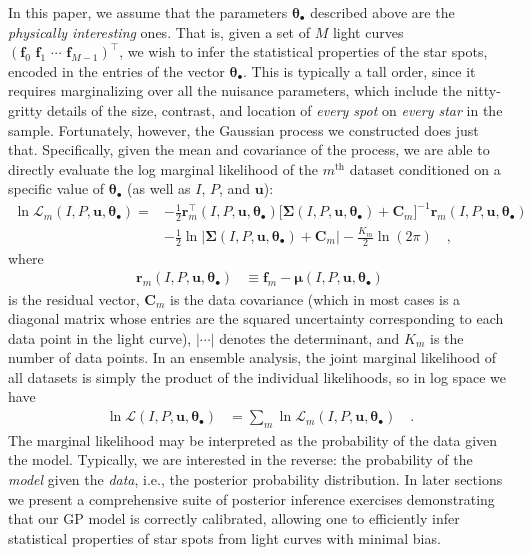 \documentclass[modern]{aastex62}
\begin{document}
In this paper, we assume that the parameters $\pmb{\theta}_\bullet$
described above are the \emph{physically interesting} ones. That is,
given a set of $M$ light curves
$\left( \mathbf{f}_0 \,\, \mathbf{f}_1 \,\, \cdots \,\,  \mathbf{f}_{M-1} \right)^\top$,
we wish to infer the statistical properties of the star spots, encoded in
the entries of the vector $\pmb{\theta}_\bullet$.
%
This is typically a tall order, since it requires marginalizing over all
the nuisance parameters, which include the nitty-gritty details of the
size, contrast, and location of \emph{every spot} on \emph{every star}
in the sample. Fortunately, however, the Gaussian process we constructed
does just that. Specifically, given the mean and covariance of the process,
we are able to directly evaluate the log marginal likelihood of the $m^\mathrm{th}$
dataset
conditioned on a specific value of $\pmb{\theta}_\bullet$ (as well as $I$,
$P$, and $\mathbf{u}$):
%
\begin{align}
    \label{eq:log-like}
    \ln \mathcal{L}_m\left(I, P, \mathbf{u}, \pmb{\theta}_\bullet\right)
    =
     & -\frac{1}{2}
    \mathbf{r}_m^\top\left(I, P, \mathbf{u}, \pmb{\theta}_\bullet\right)
    \big[
        \pmb{\Sigma}\left(I, P, \mathbf{u}, \pmb{\theta}_\bullet\right)
        +
        \mathbf{C}_m
        \big]^{-1}
    \mathbf{r}_m\left(I, P, \mathbf{u}, \pmb{\theta}_\bullet\right)
    \nonumber       \\[0.75em]
     & -
    \frac{1}{2}
    \ln \Big|
    \pmb{\Sigma}\left(I, P, \mathbf{u}, \pmb{\theta}_\bullet\right)
    +
    \mathbf{C}_m
    \Big|
    -
    \frac{K_m}{2}
    \ln \left( 2 \pi \right)
    \quad,
\end{align}
%
where
%
\begin{align}
    \mathbf{r}_m\left(I, P, \mathbf{u}, \pmb{\theta}_\bullet\right)
     & \equiv
    \mathbf{f}_m - \pmb{\mu}\left(I, P, \mathbf{u}, \pmb{\theta}_\bullet\right)
\end{align}
%
is the residual vector,
%
$\mathbf{C}_m$ is the data covariance
(which in most cases is a diagonal matrix whose entries
are the squared uncertainty corresponding to each data point in the light curve),
%
$| \cdots |$ denotes the determinant, and $K_m$ is the number of data points.
In an ensemble analysis, the joint marginal likelihood of all datasets is
simply the product of the individual likelihoods, so in log space we have
%
\begin{align}
    \ln \mathcal{L}\left(I, P, \mathbf{u}, \pmb{\theta}_\bullet\right)
     & =
    \sum_{m} \ln \mathcal{L}_m\left(I, P, \mathbf{u}, \pmb{\theta}_\bullet\right)
    \quad.
\end{align}
%
The marginal likelihood may be interpreted as the probability of the data
given the model. Typically, we are interested in the reverse: the probability
of the \emph{model} given the \emph{data}, i.e., the posterior probability
distribution. In later sections we present a comprehensive suite of
posterior inference exercises demonstrating that our GP model is correctly
calibrated, allowing one to efficiently infer statistical properties of star spots
from light curves with minimal bias.
\end{document}
